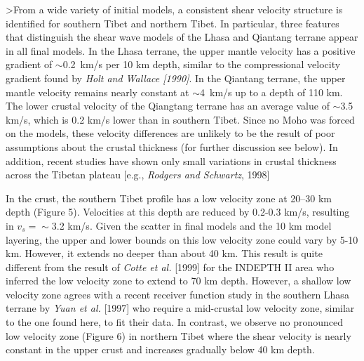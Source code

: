 \documentclass[12pt]{article}
\begin{document}
>From a wide variety of initial models, a consistent shear velocity structure is identified for southern
Tibet and northern Tibet. In particular, three features that distinguish the shear wave models of the Lhasa and Qiantang terrane appear in all final models.
In the Lhasa terrane, the upper mantle velocity has a positive gradient of $\sim$0.2~km/s per 10 km depth,
similar to the compressional velocity gradient found by {\it Holt and Wallace [1990]}.  In the Qiantang terrane,
the upper mantle velocity remains nearly constant at $\sim$4~km/s up to a depth of 110 km. The lower crustal
velocity of the Qiangtang terrane has an average value of $\sim$3.5 km/s, which is 0.2 km/s lower than in
southern Tibet.  Since no Moho was forced on the models, these velocity differences are       unlikely to be the
result of poor assumptions about the crustal thickness (for further
discussion see below).  In addition, recent studies have shown only small variations
in crustal thickness across the Tibetan plateau [e.g., {\it Rodgers and Schwartz}, 1998]

In the crust, the southern Tibet profile has a low velocity zone at 20--30 km depth (Figure 5).
Velocities at this depth are reduced by 0.2-0.3 km/s, resulting in $v_s=\sim$3.2 km/s.  Given the scatter in final
models and the 10 km model layering, the upper and lower bounds on this low velocity zone could vary by
5-10 km. However, it extends no deeper than about 40 km. This result
is quite different from the result of {\it Cotte et al.} [1999] for
the INDEPTH II area who inferred the low velocity zone to extend to 70
km depth.  However, a shallow low velocity zone agrees with a recent
receiver function study in the southern Lhasa terrane by {\it Yuan et
al.} [1997] who require a mid-crustal low velocity zone, similar to the one found here, to fit their data.  In contrast, we observe no pronounced low velocity zone (Figure 6) in northern Tibet where the shear
velocity is nearly constant in the upper crust and increases gradually below 40 km depth.
\end{document}
